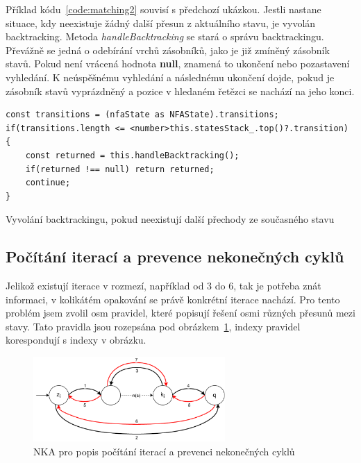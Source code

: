 Příklad kódu~\ref{code:matching2} souvisí s předchozí ukázkou. 
Jestli nastane situace, kdy neexistuje žádný další přesun z aktuálního stavu, je vyvolán backtracking.
Metoda \textit{handleBacktracking} se stará o správu backtrackingu.
Převážně se jedná o odebírání vrchů zásobníků, jako je již zmíněný zásobník stavů.
Pokud není vrácená hodnota \textbf{null}, znamená to ukončení nebo pozastavení vyhledání.
K neúspěšnému vyhledání a následnému ukončení dojde, pokud je zásobník stavů vyprázdněný a pozice v hledaném řetězci se nachází na jeho konci.

\begin{code}[!ht]
	\begin{verbatim}
const transitions = (nfaState as NFAState).transitions;
if(transitions.length <= <number>this.statesStack_.top()?.transition)
{
	const returned = this.handleBacktracking();
	if(returned !== null) return returned;
	continue;
}
	\end{verbatim}
	\caption{Vyvolání backtrackingu, pokud neexistují další přechody ze současného stavu}
	\label{code:matching2}
\end{code}


\subsection*{Počítání iterací a prevence nekonečných cyklů}

Jelikož existují iterace v rozmezí, například od 3 do 6, tak je potřeba znát informaci, v kolikátém opakování se právě konkrétní iterace nachází.
Pro tento problém jsem zvolil osm pravidel, které popisují řešení osmi různých přesunů mezi stavy.
Tato pravidla jsou rozepsána pod obrázkem~\ref{fig:ITERCNT}, indexy pravidel korespondují s indexy v obrázku.


\begin{figure}[!h]
	\centering
	\includegraphics[width=0.65\textwidth]{Figures/IterationCount.pdf}
	\caption{NKA pro popis počítání iterací a prevenci nekonečných cyklů}
	\label{fig:ITERCNT}
\end{figure}

